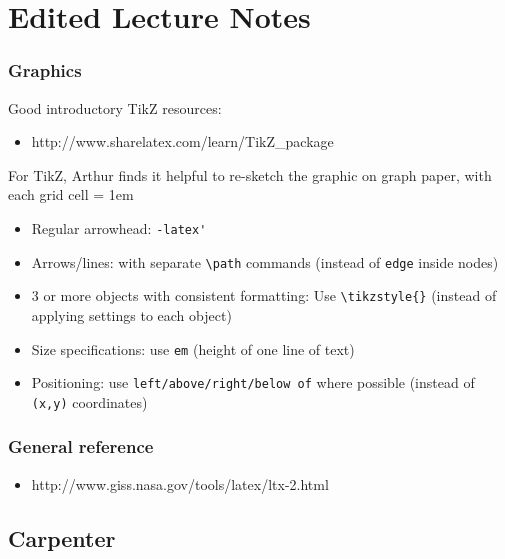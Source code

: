 \chapter{Edited Lecture Notes}\label{chap_EditedNotes}

\subsection{Graphics}

Good introductory TikZ resources:
\begin{itemize}
\item http://www.sharelatex.com/learn/TikZ\_package
\end{itemize}

For TikZ, Arthur finds it helpful to re-sketch the graphic on graph paper, with each grid cell = 1em
\begin{itemize}
\item Regular arrowhead: \verb+-latex'+
\item Arrows/lines: with separate \verb+\path+ commands (instead of \verb+edge+ inside nodes) 
\item 3 or more objects with consistent formatting: Use \verb+\tikzstyle{}+ (instead of applying settings to each object)
\item Size specifications: use \verb+em+ (height of one line of text)
\item Positioning: use \verb+left/above/right/below of+ where possible (instead of \verb+(x,y)+ coordinates)
\end{itemize}

\subsection{General reference}
\begin{itemize}
\item http://www.giss.nasa.gov/tools/latex/ltx-2.html
\end{itemize}

\section{Carpenter}


